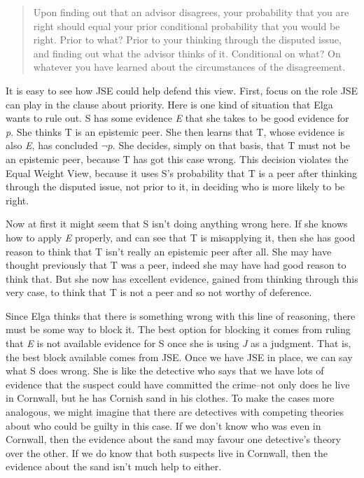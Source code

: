 \begin{quote}
Upon finding out that an advisor disagrees, your probability that you are right should equal your prior conditional probability that you would be right. Prior to what? Prior to your thinking through the disputed issue, and finding out what the advisor thinks of it. Conditional on what? On whatever you have learned about the circumstances of the disagreement. ~\citep[490]{Elga2007}
\end{quote}
It is easy to see how JSE could help defend this view. First, focus on the role JSE can play in the clause about priority. Here is one kind of situation that Elga wants to rule out. S has some evidence \emph{E} that she takes to be good evidence for \emph{p}. She thinks T is an epistemic peer. She then learns that T, whose evidence is also \emph{E}, has concluded $\neg p$. She decides, simply on that basis, that T must not be an epistemic peer, because T has got this case wrong. This decision violates the Equal Weight View, because it uses S's probability that T is a peer after thinking through the disputed issue, not prior to it, in deciding who is more likely to be right.

Now at first it might seem that S isn't doing anything wrong here. If she knows how to apply \emph{E} properly, and can see that T is misapplying it, then she has good reason to think that T isn't really an epistemic peer after all. She may have thought previously that T was a peer, indeed she may have had good reason to think that. But she now has excellent evidence, gained from thinking through this very case, to think that T is not a peer and so not worthy of deference.

Since Elga thinks that there is something wrong with this line of reasoning, there must be some way to block it. The best option for blocking it comes from ruling that \emph{E} is not available evidence for S once she is using \emph{J} as a judgment. That is, the best block available comes from JSE. Once we have JSE in place, we can say what S does wrong. She is like the detective who says that we have lots of evidence that the suspect could have committed the crime--not only does he live in Cornwall, but he has Cornish sand in his clothes. To make the cases more analogous, we might imagine that there are detectives with competing theories about who could be guilty in this case. If we don't know who was even in Cornwall, then the evidence about the sand may favour one detective's theory over the other. If we do know that both suspects live in Cornwall, then the evidence about the sand isn't much help to either.

